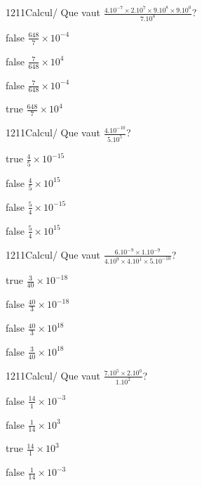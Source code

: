             \begin{question}{1211}{Calcul}{}{/}
                Que vaut $\frac{4.10^{-7}\times 2.10^{7}\times 9.10^{8}\times 9.10^{0}}{7.10^{4}}$?
            \end{question}
            \begin{reponses}
                \item[false] $\frac{648}{7}\times 10^{-4}$
                \item[false] $\frac{7}{648}\times 10^{4}$
                \item[false] $\frac{7}{648}\times 10^{-4}$
                \item[true] $\frac{648}{7}\times 10^{4}$
            \end{reponses}
            \begin{question}{1211}{Calcul}{}{/}
                Que vaut $\frac{4.10^{-10}}{5.10^{5}}$?
            \end{question}
            \begin{reponses}
                \item[true] $\frac{4}{5}\times 10^{-15}$
                \item[false] $\frac{4}{5}\times 10^{15}$
                \item[false] $\frac{5}{4}\times 10^{-15}$
                \item[false] $\frac{5}{4}\times 10^{15}$
            \end{reponses}
            \begin{question}{1211}{Calcul}{}{/}
                Que vaut $\frac{6.10^{-9}\times 1.10^{-9}}{4.10^{9}\times 4.10^{1}\times 5.10^{-10}}$?
            \end{question}
            \begin{reponses}
                \item[true] $\frac{3}{40}\times 10^{-18}$
                \item[false] $\frac{40}{3}\times 10^{-18}$
                \item[false] $\frac{40}{3}\times 10^{18}$
                \item[false] $\frac{3}{40}\times 10^{18}$
            \end{reponses}
            \begin{question}{1211}{Calcul}{}{/}
                Que vaut $\frac{7.10^{5}\times 2.10^{0}}{1.10^{2}}$?
            \end{question}
            \begin{reponses}
                \item[false] $\frac{14}{1}\times 10^{-3}$
                \item[false] $\frac{1}{14}\times 10^{3}$
                \item[true] $\frac{14}{1}\times 10^{3}$
                \item[false] $\frac{1}{14}\times 10^{-3}$
            \end{reponses}

